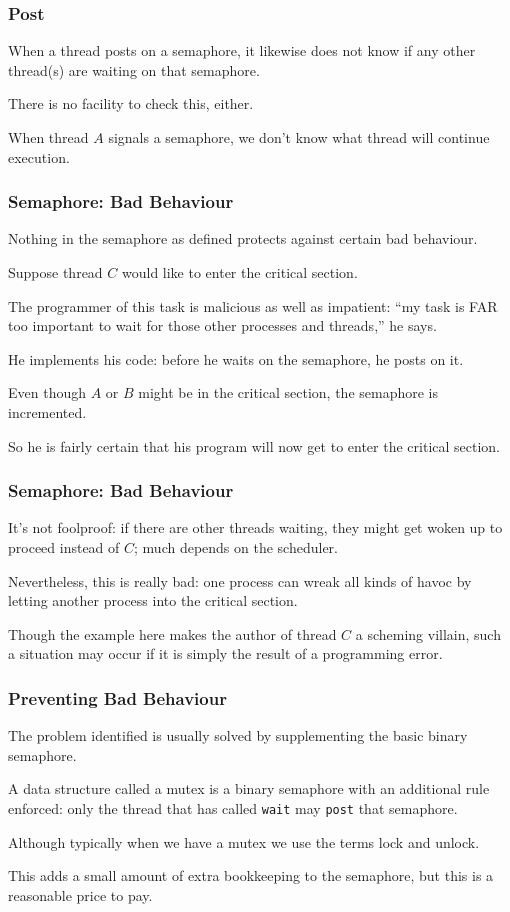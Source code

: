 \begin{frame}
\frametitle{Post}

When a thread posts on a semaphore, it likewise does not know if any other thread(s) are waiting on that semaphore. 

There is no facility to check this, either. 

When thread $A$ signals a semaphore, we don't know what thread will continue execution.


\end{frame}

\begin{frame}
\frametitle{Semaphore: Bad Behaviour}

Nothing in the semaphore as defined protects against certain bad behaviour.

Suppose thread $C$ would like to enter the critical section. 

The programmer of this task is malicious as well as impatient: ``my task is FAR too important to wait for those other processes and threads,'' he says. 

He implements his code: before he waits on the semaphore, he posts on it. 

Even though $A$ or $B$ might be in the critical section, the semaphore is incremented.

So he is fairly certain that his program will now get to enter the critical section. 
\end{frame}

\begin{frame}
\frametitle{Semaphore: Bad Behaviour}

It's not foolproof: if there are other threads waiting, they might get woken up to proceed instead of $C$; much depends on the scheduler. 

Nevertheless, this is really bad: one process can wreak all kinds of havoc by letting another process into the critical section. 

Though the example here makes the author of thread $C$ a scheming villain, such a situation may occur if it is simply the result of a programming error.

\end{frame}

\begin{frame}
\frametitle{Preventing Bad Behaviour}

The problem identified is usually solved by supplementing the basic binary semaphore. 

A data structure called a \alert{mutex} is a binary semaphore with an additional rule enforced: only the thread that has called \texttt{wait} may \texttt{post} that semaphore. 

Although typically when we have a mutex we use the terms \alert{lock} and \alert{unlock}.

This adds a small amount of extra bookkeeping to the semaphore, but this is a reasonable price to pay.

\end{frame}

